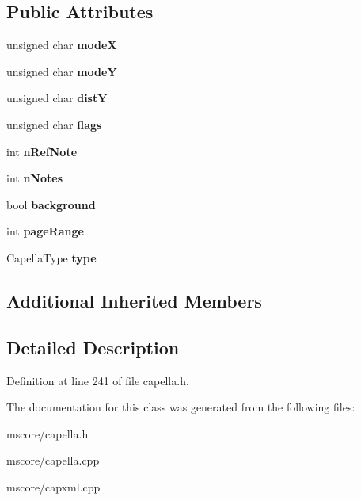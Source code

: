 \subsection*{Public Attributes}
\begin{DoxyCompactItemize}
\item 
\mbox{\label{class_ms_1_1_basic_draw_obj_a7cb4e1b8105b5ad9a3364aea8daf8020}} 
unsigned char {\bfseries modeX}
\item 
\mbox{\label{class_ms_1_1_basic_draw_obj_a27509b0e8258a29ec6cf486021ae45ca}} 
unsigned char {\bfseries modeY}
\item 
\mbox{\label{class_ms_1_1_basic_draw_obj_a45a31659f271be44ae5cc28ee639e82c}} 
unsigned char {\bfseries distY}
\item 
\mbox{\label{class_ms_1_1_basic_draw_obj_a1112f4d8f5835ef8565041d2563b379c}} 
unsigned char {\bfseries flags}
\item 
\mbox{\label{class_ms_1_1_basic_draw_obj_a107c16564101ab1ad6bccaefca1b29c2}} 
int {\bfseries n\+Ref\+Note}
\item 
\mbox{\label{class_ms_1_1_basic_draw_obj_a852f3fe9bbf265c08ea451ef356a46a8}} 
int {\bfseries n\+Notes}
\item 
\mbox{\label{class_ms_1_1_basic_draw_obj_a96441bf966477693c58441126118d699}} 
bool {\bfseries background}
\item 
\mbox{\label{class_ms_1_1_basic_draw_obj_a27027e924b0dc961893a252b0e90788e}} 
int {\bfseries page\+Range}
\item 
\mbox{\label{class_ms_1_1_basic_draw_obj_a3b6b7116016fee8b4df0dcd4383e682c}} 
Capella\+Type {\bfseries type}
\end{DoxyCompactItemize}
\subsection*{Additional Inherited Members}


\subsection{Detailed Description}


Definition at line 241 of file capella.\+h.



The documentation for this class was generated from the following files\+:\begin{DoxyCompactItemize}
\item 
mscore/capella.\+h\item 
mscore/capella.\+cpp\item 
mscore/capxml.\+cpp\end{DoxyCompactItemize}
